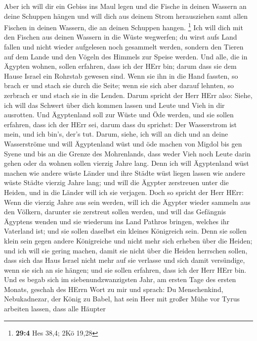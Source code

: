 Aber ich will dir ein Gebiss ins Maul legen und die Fische in deinen
Wassern an deine Schuppen hängen und will dich aus deinem Strom
herausziehen samt allen Fischen in deinen Wassern, die an deinen
Schuppen hangen. \footnote{\textbf{29:4} Hes 38,4; 2Kö 19,28}
 Ich will dich mit den Fischen aus deinen Wassern in die
Wüste wegwerfen; du wirst aufs Land fallen und nicht wieder aufgelesen
noch gesammelt werden, sondern den Tieren auf dem Lande und den Vögeln
des Himmels zur Speise werden.  Und alle, die in Ägypten
wohnen, sollen erfahren, dass ich der HErr bin; darum dass sie dem Hause
Israel ein Rohrstab gewesen sind.  Wenn sie ihn in die Hand
fassten, so brach er und stach sie durch die Seite; wenn sie sich aber
darauf lehnten, so zerbrach er und stach sie in die Lenden. 
Darum spricht der Herr HErr also: Siehe, ich will das Schwert über dich
kommen lassen und Leute und Vieh in dir ausrotten.  Und
Ägyptenland soll zur Wüste und Öde werden, und sie sollen erfahren, dass
ich der HErr sei, darum dass du sprichst: Der Wasserstrom ist mein, und
ich bin's, der's tut.  Darum, siehe, ich will an dich und
an deine Wasserströme und will Ägyptenland wüst und öde machen von
Migdol bis gen Syene und bis an die Grenze des Mohrenlands,
 dass weder Vieh noch Leute darin gehen oder da wohnen
sollen vierzig Jahre lang.  Denn ich will Ägyptenland wüst
machen wie andere wüste Länder und ihre Städte wüst liegen lassen wie
andere wüste Städte vierzig Jahre lang; und will die Ägypter zerstreuen
unter die Heiden, und in die Länder will ich sie verjagen. 
Doch so spricht der Herr HErr: Wenn die vierzig Jahre aus sein werden,
will ich die Ägypter wieder sammeln aus den Völkern, darunter sie
zerstreut sollen werden,  und will das Gefängnis Ägyptens
wenden und sie wiederum ins Land Pathros bringen, welches ihr Vaterland
ist; und sie sollen daselbst ein kleines Königreich sein. 
Denn sie sollen klein sein gegen andere Königreiche und nicht mehr sich
erheben über die Heiden; und ich will sie gering machen, damit sie nicht
über die Heiden herrschen sollen,  dass sich das Haus
Israel nicht mehr auf sie verlasse und sich damit versündige, wenn sie
sich an sie hängen; und sie sollen erfahren, dass ich der Herr HErr bin.
 Und es begab sich im siebenundzwanzigsten Jahr, am ersten
Tage des ersten Monats, geschah des HErrn Wort zu mir und sprach:
 Du Menschenkind, Nebukadnezar, der König zu Babel, hat
sein Heer mit großer Mühe vor Tyrus arbeiten lassen, dass alle Häupter
